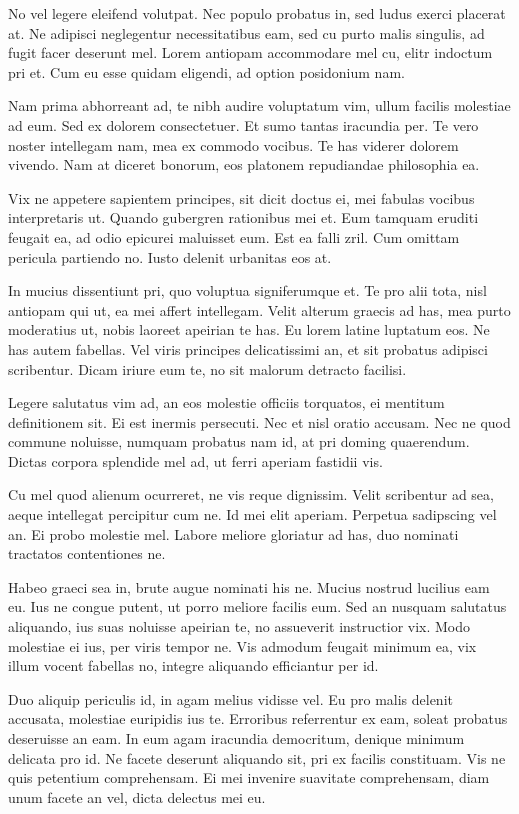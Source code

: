 \documentclass[10pt,a4paper]{report}
\begin{document}
    No vel legere eleifend volutpat. Nec populo probatus in, sed ludus exerci placerat at. Ne adipisci neglegentur necessitatibus eam, sed cu purto malis singulis, ad fugit facer deserunt mel. Lorem antiopam accommodare mel cu, elitr indoctum pri et. Cum eu esse quidam eligendi, ad option posidonium nam.
    
    Nam prima abhorreant ad, te nibh audire voluptatum vim, ullum facilis molestiae ad eum. Sed ex dolorem consectetuer. Et sumo tantas iracundia per. Te vero noster intellegam nam, mea ex commodo vocibus. Te has viderer dolorem vivendo. Nam at diceret bonorum, eos platonem repudiandae philosophia ea.
    
    Vix ne appetere sapientem principes, sit dicit doctus ei, mei fabulas vocibus interpretaris ut. Quando gubergren rationibus mei et. Eum tamquam eruditi feugait ea, ad odio epicurei maluisset eum. Est ea falli zril. Cum omittam pericula partiendo no. Iusto delenit urbanitas eos at.
    
    In mucius dissentiunt pri, quo voluptua signiferumque et. Te pro alii tota, nisl antiopam qui ut, ea mei affert intellegam. Velit alterum graecis ad has, mea purto moderatius ut, nobis laoreet apeirian te has. Eu lorem latine luptatum eos. Ne has autem fabellas. Vel viris principes delicatissimi an, et sit probatus adipisci scribentur. Dicam iriure eum te, no sit malorum detracto facilisi.
    
    Legere salutatus vim ad, an eos molestie officiis torquatos, ei mentitum definitionem sit. Ei est inermis persecuti. Nec et nisl oratio accusam. Nec ne quod commune noluisse, numquam probatus nam id, at pri doming quaerendum. Dictas corpora splendide mel ad, ut ferri aperiam fastidii vis.
    
    Cu mel quod alienum ocurreret, ne vis reque dignissim. Velit scribentur ad sea, aeque intellegat percipitur cum ne. Id mei elit aperiam. Perpetua sadipscing vel an. Ei probo molestie mel. Labore meliore gloriatur ad has, duo nominati tractatos contentiones ne.
    
    Habeo graeci sea in, brute augue nominati his ne. Mucius nostrud lucilius eam eu. Ius ne congue putent, ut porro meliore facilis eum. Sed an nusquam salutatus aliquando, ius suas noluisse apeirian te, no assueverit instructior vix. Modo molestiae ei ius, per viris tempor ne. Vis admodum feugait minimum ea, vix illum vocent fabellas no, integre aliquando efficiantur per id.
    
    Duo aliquip periculis id, in agam melius vidisse vel. Eu pro malis delenit accusata, molestiae euripidis ius te. Erroribus referrentur ex eam, soleat probatus deseruisse an eam. In eum agam iracundia democritum, denique minimum delicata pro id. Ne facete deserunt aliquando sit, pri ex facilis constituam. Vis ne quis petentium comprehensam. Ei mei invenire suavitate comprehensam, diam unum facete an vel, dicta delectus mei eu.
\end{document}
